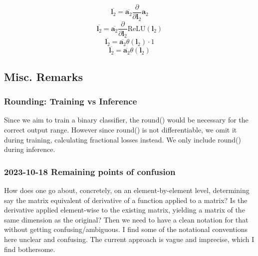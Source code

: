 \documentclass{article}
\begin{document}
\[\overline{\bm{l}_2} = \overline{\bm{a}_2} \frac{\partial}{\partial{\bm{l}_2}} \bm{a}_2\]
\[\overline{\bm{l}_2} = \overline{\bm{a}_2} \frac{\partial}{\partial{\bm{l}_2}} \text{ReLU}(\bm{l}_2)\]
\[\overline{\bm{l}_2} = \overline{\bm{a}_2} \theta(\bm{l}_2) \cdot 1\]
\begin{equation}\overline{\bm{l}_2} = \overline{\bm{a}_2} \theta(\bm{l}_2)  \end{equation}


\subsection{Misc. Remarks}
\subsubsection{Rounding: Training vs Inference} Since we aim to train a binary classifier, the round() would be necessary for the correct output range. However since round() is not differentiable, we omit it during training, calculating fractional losses instead. We only include round() during inference.
\subsubsection{2023-10-18 Remaining points of confusion} How does one go about, concretely, on an element-by-element
level, determining say the matrix equivalent of derivative of a function applied to a matrix? 
Is the derivative applied element-wise to the existing matrix, yielding a matrix of the same dimension as the original?
Then we need to have a clean notation for that without getting confusing/ambiguous. I find some of the notational
conventions here unclear and confusing. The current approach is vague and imprecise, which I find bothersome.
\end{document}
